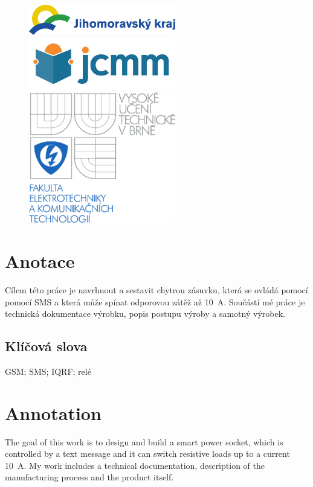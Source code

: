 \documentclass[12pt,a4paper,oneside]{article}
\begin{document}
\vspace{8mm}
\begin{figure}[!htb]
	\includegraphics[width = 64mm]{img/logo/jmk.pdf} \\[8mm]
	\includegraphics[width = 64mm]{img/logo/jcmm.jpg}
\endminipage
{}
	\includegraphics[width = 64mm]{img/logo/vut.pdf}
\endminipage
\end{figure}

\newpage

\section*{Anotace}

Cílem této práce je navrhnout a sestavit chytrou zásuvku, která se ovládá pomocí pomocí SMS a která může spínat odporovou zátěž až 10~A. Součástí mé práce je technická dokumentace výrobku, popis postupu výroby a samotný výrobek.

\subsection*{Klíčová slova}

GSM; SMS; IQRF; relé

\section*{Annotation}

The goal of this work is to design and build a smart power socket, which is controlled by a text message and it can switch resistive loads up to a current 10~A. My work includes a technical documentation, description of the manufacturing process and the product itself.
\end{document}
